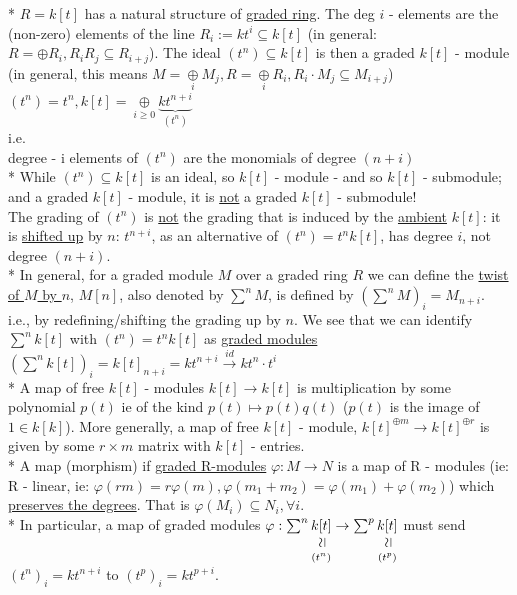 \documentclass[11pt,a4paper]{report}
\newcommand{\vertsimeq}{\rotatebox{90}{$\,\simeq$}}
\newcommand{\simequalto}[2]{\underset{\scriptstyle\overset{\mkern4mu\vertsimeq}{#2}}{#1}}
\begin{document}
              * $R = k[t]$ has a natural structure of \underline{graded ring}. The deg $i$ - elements are the (non-zero) elements of the line $R_i := kt^i \subseteq k[t]$ (in general: $R = \oplus R_i, R_iR_j \subseteq R_{i+j}$).
              The ideal $(t^n) \subseteq k[t]$ is then a graded $k[t]$ - module (in general, this means $M = \underset{i}{\oplus} M_j, R = \underset{i}{\oplus} R_i, R_i \cdot M_j \subseteq M_{i+j}$) $(t^n) = t^n, k[t] = \underset{i \ge 0}{\oplus} \underbrace{kt^{n+i}}_{(t^{n})}$\\
              i.e.\\
              degree - i elements of $(t^n)$ are the monomials of degree $(n+i)$\\
              * While $(t^n) \subseteq k[t]$ is an ideal, so $k[t]$ - module - and so $k[t]$ - submodule; and a graded $k[t]$ - module, it is \underline{not} a graded $k[t]$ - submodule!\\
              The grading of $(t^n)$ is \underline{not} the grading that is induced by the \underline{ambient} $k[t]$: it is \underline{shifted up} by $n$: $t^{n+i}$, as an alternative of $(t^n) = t^nk[t]$, has degree $i$, not degree $(n+i)$.\\
              * In general, for a graded module $M$ over a graded ring $R$ we can define the \underline{twist of $M$ by $n$}, $M[n]$, also denoted by $\sum^nM$, is defined by $(\sum^nM)_i = M_{n+i}$.\\
              i.e., by redefining/shifting the grading up by $n$. We see that we can identify $\sum^nk[t]$ with $(t^n) = t^nk[t]$ as \underline{graded modules} $(\sum^nk[t])_i = k[t]_{n+i} = kt^{n+i} \xrightarrow{id} kt^n\cdot t^i$\\
              * A map of free $k[t]$ - modules $k[t] \rightarrow k[t]$ is multiplication by some polynomial $p(t)$ ie of the kind $p(t) \mapsto p(t)q(t)$ ($p(t)$ is the image of $1 \in k[k]$). More generally, a map of free $k[t]$ - module, $k[t]^{\oplus m} \rightarrow k[t]^{\oplus r}$ is given by some $r \times m$ matrix with $k[t]$ - entries.\\
              * A map (morphism) if \underline{graded R-modules} $\varphi: M \rightarrow N$ is a map of R - modules (ie: R - linear, ie: $\varphi(rm) = r \varphi(m), \varphi(m_1 + m_2) = \varphi(m_1) + \varphi(m_2)$) which \underline{preserves the degrees}. That is $\varphi(M_i) \subseteq N_i, \forall i$.\\
              * In particular, a map of graded modules $\varphi: \sum^n\simequalto{k[t]}{(t^n)} \rightarrow \sum^p\simequalto{k[t]}{(t^p)}$ must send $(t^n)_i = kt^{n+i}$ to $(t^p)_i = kt^{p+i}$.\\
\end{document}
